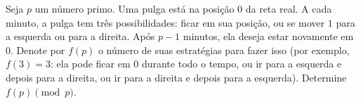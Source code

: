 Seja \(p\) um número primo. Uma pulga está na posição \(0\) da reta real. A cada minuto, a pulga tem três possibilidades: ficar em sua posição, ou se mover \(1\) para a esquerda ou para a direita. Após \(p-1\) minutos, ela deseja estar novamente em \(0\). Denote por \(f(p)\) o número de suas estratégias para fazer isso (por exemplo, \(f(3)=3\): ela pode ficar em \(0\) durante todo o tempo, ou ir para a esquerda e depois para a direita, ou ir para a direita e depois para a esquerda). Determine \(f(p) \pmod p\).
